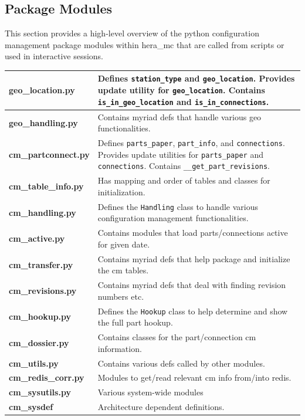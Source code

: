 \documentclass{article}
\begin{document}
\subsection{Package Modules}
This section provides a high-level overview of the python configuration management package modules within hera\_mc that are called from scripts or used in interactive sessions.
\vspace{0.5cm}

\begin{tabular}{l p{12cm}}
{\bf geo\_location.py} & Defines {\tt station\_type} and {\tt geo\_location}.  Provides update utility for {\tt geo\_location}.  Contains {\tt is\_in\_geo\_location} and {\tt is\_in\_connections}. \\ \hline
{\bf geo\_handling.py} & Contains myriad defs that handle various geo functionalities.\\ \hline
{\bf cm\_partconnect.py} & Defines {\tt parts\_paper}, {\tt part\_info}, and {\tt connections}.  Provides update utilities for {\tt parts\_paper} and {\tt connections}. Contains {\tt \_\_get\_part\_revisions}. \\ \hline
{\bf cm\_table\_info.py} & Has mapping and order of tables and classes for initialization. \\ \hline
{\bf cm\_handling.py} & Defines the {\tt Handling} class to handle various configuration management functionalities.\\ \hline
{\bf cm\_active.py} & Contains modules that load parts/connections active for given date. \\ \hline
{\bf cm\_transfer.py} & Contains myriad defs that help package and initialize the cm tables.\\ \hline
{\bf cm\_revisions.py} & Contains myriad defs that deal with finding revision numbers etc.\\ \hline
{\bf cm\_hookup.py} & Defines the {\tt Hookup} class to help determine and show the full part hookup.\\ \hline
{\bf cm\_dossier.py} & Contains classes for the part/connection cm information.\\ \hline
{\bf cm\_utils.py} & Contains various defs called by other modules.\\ \hline
{\bf cm\_redis\_corr.py} & Modules to get/read relevant cm info from/into redis.\\ \hline
{\bf cm\_sysutils.py} & Various system-wide modules \\ \hline
{\bf cm\_sysdef} & Architecture dependent definitions.
\end{tabular}
\end{document}
